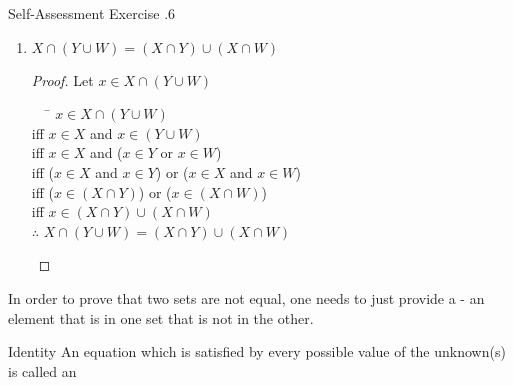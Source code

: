 \documentclass[\main/notes.tex]{subfiles}
\begin{document}
\begin{exercise}{Self-Assessment Exercise \thechapter.6}
\begin{multicols}{2}
\begin{enumerate}[label=(\alph*), itemsep=0.5em]
\begin{proof}
\begin{tabbing}
									iff \> $x \in (X \cap Y) \cap W$\\
									$\therefore$ \> $X \cap (Y \cap W) = (X \cap Y) \cap W$
								\end{tabbing}
							\end{proof}
						\item $X \cap (Y \cup W) = (X \cap Y) \cup (X \cap W)$
							\begin{proof}
								Let $x \in X \cap (Y \cup W)$
								\begin{tabbing}
									$\quad$ \= $x \in X \cap (Y \cup W)$\\
									iff \> $x \in X$ and $x \in (Y \cup W)$\\
									iff \> $x \in X$ and ($x \in Y$ or $x \in W$)\\
									iff \> ($x \in X$ and $x \in Y$) or ($x \in X$ and $x \in W$)\\
									iff \> ($x \in (X \cap Y)$) or ($x \in (X \cap W)$)\\
									iff \> $x \in (X \cap Y) \cup (X \cap W)$\\
									$\therefore$ \> $X \cap (Y \cup W) = (X \cap Y) \cup (X \cap W)$
								\end{tabbing}
							\end{proof}
					\end{enumerate}
				\end{multicols}
			\end{exercise}
			In order to prove that two sets are not equal, one needs to just provide a  - an element that is in one set that is not in the other.
			\begin{definition}{Identity}
				An equation which is satisfied by every possible value of the unknown(s) is called an 
			\end{definition}
		\pagebreak
\end{document}
